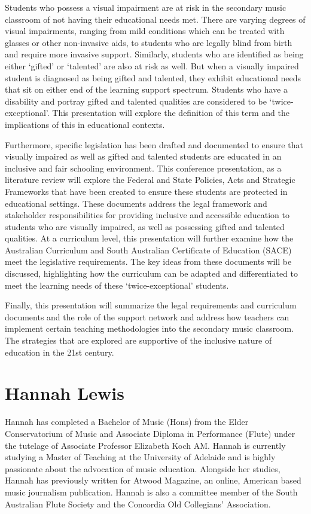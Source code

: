 \documentclass[twoside,14pt,a4paper,notitlepage]{memoir}
\begin{document}
Students who possess a visual impairment are at risk in the secondary music classroom of not having their educational needs met. There are varying degrees of visual impairments, ranging from mild conditions which can be treated with glasses or other non-invasive aids, to students who are legally blind from birth and require more invasive support. Similarly, students who are identified as being either ‘gifted’ or ‘talented’ are also at risk as well. But when a visually impaired student is diagnosed as being gifted and talented, they exhibit educational needs that sit on either end of the learning support spectrum. Students who have a disability and portray gifted and talented qualities are considered to be ‘twice-exceptional’. This presentation will explore the definition of this term and the implications of this in educational contexts.    
 
Furthermore, specific legislation has been drafted and documented to ensure that visually impaired as well as gifted and talented students are educated in an inclusive and fair schooling environment. This conference presentation, as a literature review will explore the Federal and State Policies, Acts and Strategic Frameworks that have been created to ensure these students are protected in educational settings. These documents address the legal framework and stakeholder responsibilities for providing inclusive and accessible education to students who are visually impaired, as well as possessing gifted and talented qualities. At a curriculum level, this presentation will further examine how the Australian Curriculum and South Australian Certificate of Education (SACE) meet the legislative requirements. The key ideas from these documents will be discussed, highlighting how the curriculum can be adapted and differentiated to meet the learning needs of these ‘twice-exceptional’ students. 
 
Finally, this presentation will summarize the legal requirements and curriculum documents and the role of the support network and address how teachers can implement certain teaching methodologies into the secondary music classroom. The strategies that are explored are supportive of the inclusive nature of education in the 21st century.

\section*{Hannah Lewis}

Hannah has completed a Bachelor of Music (Hons) from the Elder Conservatorium of Music  and Associate Diploma in Performance (Flute) under the tutelage of Associate Professor Elizabeth Koch AM. Hannah is currently studying a Master of Teaching at the University of Adelaide and is highly passionate about the advocation of music education. Alongside her studies, Hannah has previously written for Atwood Magazine, an online, American based music journalism publication. Hannah is also a committee member of the South Australian Flute Society and the Concordia Old Collegians’ Association. 
\end{document}

